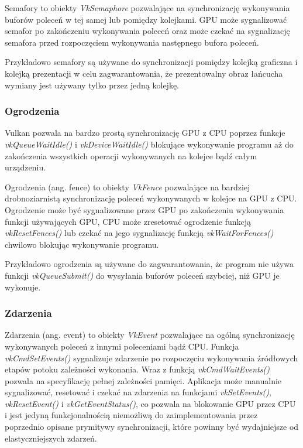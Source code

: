 Semafory to obiekty \textit{VkSemaphore} pozwalające na synchronizację wykonywania buforów poleceń w tej samej lub pomiędzy kolejkami. GPU
może sygnalizować semafor po zakończeniu wykonywania poleceń oraz może czekać na sygnalizację semafora przed
rozpoczęciem wykonywania następnego bufora poleceń.

Przykładowo semafory są używane do synchronizacji pomiędzy kolejką
graficzna i kolejką prezentacji w celu zagwarantowania, że prezentowalny obraz łańcucha wymiany jest używany tylko przez jedną kolejkę.

\subsubsection{Ogrodzenia}

Vulkan pozwala na bardzo prostą synchronizację GPU z CPU poprzez funkcje \textit{vkQueueWaitIdle()} i \textit{vkDeviceWaitIdle()} blokujące wykonywanie programu aż do zakończenia wszystkich operacji wykonywanych na kolejce bądź całym urządzeniu.

Ogrodzenia (ang. fence) to obiekty \textit{VkFence} pozwalające na bardziej drobnoziarnistą synchronizację poleceń wykonywanych w kolejce na GPU z CPU.
Ogrodzenie może być sygnalizowane przez GPU po zakończeniu wykonywania funkcji używających GPU, CPU może zresetować ogrodzenie
funkcją \textit{vkResetFences()} lub czekać na jego sygnalizację funkcją \textit{vkWaitForFences()} chwilowo blokując wykonywanie programu.

Przykładowo ogrodzenia są używane do zagwarantowania, że program nie używa funkcji \textit{vkQueueSubmit()} do wysyłania buforów poleceń szybciej, niż GPU je wykonuje.

\subsubsection{Zdarzenia}
Zdarzenia (ang. event) to obiekty \textit{VkEvent} pozwalające na ogólną synchronizację wykonywanych poleceń z innymi poleceniami bądź CPU.
Funkcja \textit{vkCmdSetEvents()} sygnalizuje zdarzenie po rozpoczęciu wykonywania źródłowych etapów potoku zależności wykonania. Wraz z funkcją \textit{vkCmdWaitEvents()} pozwala na specyfikację pełnej zależności pamięci.
Aplikacja może manualnie sygnalizować, resetować i czekać na zdarzenia na funkcjami \textit{vkSetEvents()}, \textit{vkResetEvent()} i \textit{vkGetEventStatus()}, co pozwala na blokowanie GPU przez CPU i jest jedyną funkcjonalnością niemożliwą do zaimplementowania przez poprzednio opisane prymitywy synchronizacji, które powinny być wydajniejsze od elastyczniejszych zdarzeń.






